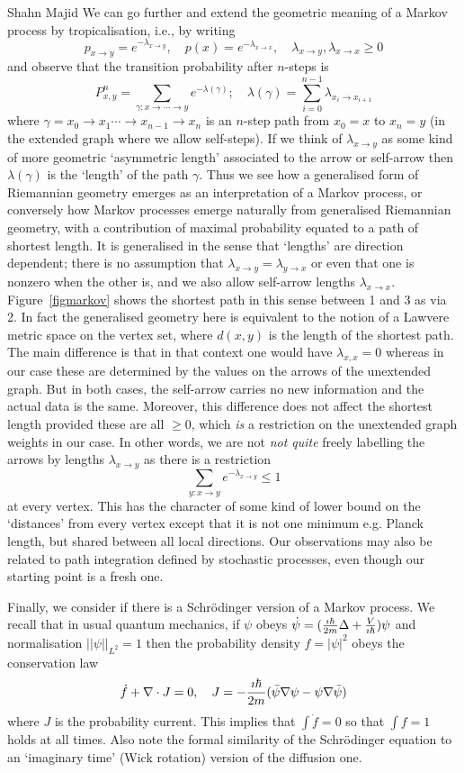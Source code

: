 \begin{artengenv}{Shahn Majid}
We can go further and extend the geometric meaning of a Markov process by tropicalisation, i.e., by writing 
\[ p_{x\to y}= e^{-\lambda_{x\to y}},\quad p(x)=e^{-\lambda_{x\to x}},\quad \lambda_{x\to y}, \lambda_{x\to x}\ge 0\]
and observe that the transition probability after $n$-steps is
\[ P^n_{x,y}=\sum_{\gamma: x\to \cdots\to y} e^{- \lambda(\gamma)};\quad \lambda(\gamma)=\sum_{i=0}^{n-1}\lambda_{x_i\to x_{i+1}}\]
where $\gamma=x_0\to x_1\cdots \to x_{n-1}\to x_n$ is an $n$-step path from $x_0=x$ to $x_n=y$ (in the extended graph where we allow self-steps). If we think of $\lambda_{x\to y}$ as some kind of more geometric `asymmetric length' associated to the arrow or self-arrow then $\lambda(\gamma)$ is the `length' of the path $\gamma$. Thus we see how a generalised form of Riemannian geometry emerges as an interpretation of a Markov process, or conversely how Markov processes emerge naturally from generalised Riemannian geometry, with a contribution of maximal probability equated to a path of shortest length. It is generalised in the sense that `lengths' are direction dependent; there is no assumption that $\lambda_{x\to y}=\lambda_{y\to x}$ or even that one is nonzero when the other is, and we also allow self-arrow lengths $\lambda_{x\to x}$. Figure~\ref{figmarkov} shows the shortest path in this sense between 1 and 3 as via 2. In fact the generalised geometry here
is equivalent to the notion of a Lawvere metric space \parencite{ApCat} on the vertex set, where $d(x,y)$ is the length of the shortest path. The main difference is that in that context one would have $\lambda_{x,x}=0$ whereas in our case these are determined by the values on the arrows of the unextended graph. But in both cases, the self-arrow carries no new information and the actual data is the same. Moreover, this difference does not affect the shortest length provided these are all $\ge 0$, which {\em is} a restriction on the unextended graph weights in our case. In other words, we are not {\em not quite} freely labelling the arrows by lengths $\lambda_{x\to y}$ as there is a restriction
\[ \sum_{y: x\to y} e^{-\lambda_{x\to y}}\le 1\]
at every vertex. This has the character of some kind of lower bound on the `distances' from every vertex except that it is not one minimum e.g. Planck length, but shared between all local directions. Our observations may also be related to path integration defined by stochastic processes, even though our starting point is a fresh one. 


Finally, we consider if there is a Schr\"odinger version of a Markov process. We recall that in usual quantum mechanics, if $\psi$ obeys $\dot\psi= ({\imath\hbar\over 2 m}\Delta+ {V\over \imath\hbar})\psi$ and normalisation $||\psi||_{L^2}=1$ then the probability density $f=|\psi|^2$ obeys the conservation law
\[ \dot f+ \nabla\cdot J=0,\quad J=-{\imath\hbar\over 2m}(\bar\psi\nabla\psi - \psi \nabla\bar\psi)\]
where $J$ is the probability current. This implies that $\int \dot f=0$ so that $\int f=1$ holds at all times. Also note the formal similarity of the Schr\"odinger equation to an `imaginary time' (Wick rotation) version of the diffusion one.


\end{artengenv}
